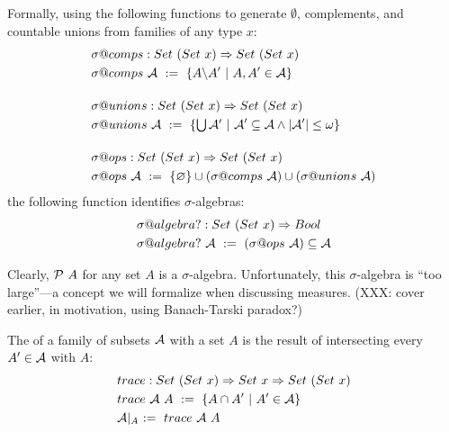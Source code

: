 \documentclass[preprint]{sigplanconf}
\newcommand{\restrict}[1]{\lvert_{#1}}
\begin{document}
Formally, using the following functions to generate $\emptyset$, complements, and countable unions from families of any type $x$:
\begin{align}
	&\begin{aligned}
		&\sigma@comps : Set~(Set~x) \tto Set~(Set~x) \\
		&\sigma@comps~\A \ := \ \setb{A \w A'}{A, A' \in \A} \\
	\end{aligned} \\
\nonumber \\[-6pt]
	&\begin{aligned}
		&\sigma@unions : Set~(Set~x) \tto Set~(Set~x) \\
		&\sigma@unions~\A \ := \ \setb{\U\A'}{\A' \subseteq \A \band |\A'| \leq \omega} \\
	\end{aligned} \\
\nonumber \\[-6pt]
	&\begin{aligned}
		&\sigma@ops : Set~(Set~x) \tto Set~(Set~x) \\
		&\sigma@ops~\A \ := \ \set{\emptyset} \u (\sigma@comps~\A) \u (\sigma@unions~\A) \\
	\end{aligned}
\end{align}
the following function identifies $\sigma$-algebras:
\begin{equation}
\begin{aligned}
	&\sigma@algebra? : Set~(Set~x) \tto Bool \\
	&\sigma@algebra?~\A \ := \ (\sigma@ops~\A) \subseteq \A
\end{aligned}
\end{equation}

Clearly, $\mathcal{P}~A$ for any set $A$ is a $\sigma$-algebra.
Unfortunately, this $\sigma$-algebra is ``too large''---a concept we will formalize when discussing measures.
(XXX: cover earlier, in motivation, using Banach-Tarski paradox?)

The  of a family of subsets $\mathcal{A}$ with a set $A$ is the result of intersecting every $A' \in \mathcal{A}$ with $A$:
\begin{equation}
\begin{aligned}
	&trace : Set~(Set~x) \tto Set~x \tto Set~(Set~x) \\
	&trace~\A~A \ := \ \setb{A \i A'}{A' \in \A} \\
	&\A\restrict{A} \ := \ trace~\A~A
\end{aligned}
\end{equation}
\end{document}
